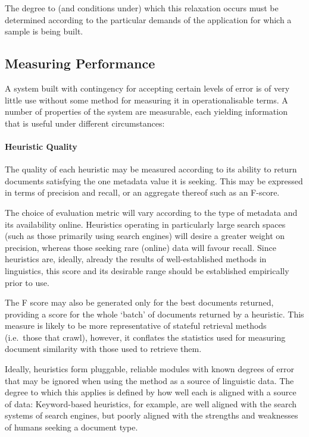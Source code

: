 The degree to (and conditions under) which this relaxation occurs must be determined according to the particular demands of the application for which a sample is being built.



\subsection{Measuring Performance}
A system built with contingency for accepting certain levels of error is of very little use without some method for measuring it in operationalisable terms. A number of properties of the system are measurable, each yielding information that is useful under different circumstances:


\paragraph{Heuristic Quality}
The quality of each heuristic may be measured according to its ability to return documents satisfying the one metadata value it is seeking.  This may be expressed in terms of precision and recall, or an aggregate thereof such as an F-score.

The choice of evaluation metric will vary according to the type of metadata and its availability online.  Heuristics operating in particularly large search spaces (such as those primarily using search engines) will desire a greater weight on precision, whereas those seeking rare (online) data will favour recall.  Since heuristics are, ideally, already the results of well-established methods in linguistics, this score and its desirable range should be established empirically prior to use.

The F score may also be generated only for the best documents returned, providing a score for the whole `batch' of documents returned by a heuristic.  This measure is likely to be more representative of stateful retrieval methods (i.e.\ those that crawl), however, it conflates the statistics used for measuring document similarity with those used to retrieve them.

Ideally, heuristics form pluggable, reliable modules with known degrees of error that may be ignored when using the method as a source of linguistic data.  The degree to which this applies is defined by how well each is aligned with a source of data: Keyword-based heuristics, for example, are well aligned with the search systems of search engines, but poorly aligned with the strengths and weaknesses of humans seeking a document type.

